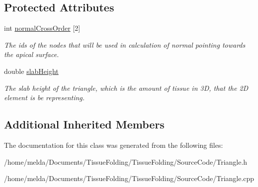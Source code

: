 \subsection*{Protected Attributes}
\begin{DoxyCompactItemize}
\item 
\hypertarget{classTriangle_a39f71d3edb0f3ba6fc632d6dcf5237ac}{}int \hyperlink{classTriangle_a39f71d3edb0f3ba6fc632d6dcf5237ac}{normal\+Cross\+Order} \mbox{[}2\mbox{]}\label{classTriangle_a39f71d3edb0f3ba6fc632d6dcf5237ac}

\begin{DoxyCompactList}\small\item\em The ids of the nodes that will be used in calculation of normal pointing towards the apical surface. \end{DoxyCompactList}\item 
\hypertarget{classTriangle_a78b065ab25dff7133101ec341638532d}{}double \hyperlink{classTriangle_a78b065ab25dff7133101ec341638532d}{slab\+Height}\label{classTriangle_a78b065ab25dff7133101ec341638532d}

\begin{DoxyCompactList}\small\item\em The slab height of the triangle, which is the amount of tissue in 3\+D, that the 2\+D element is be representing. \end{DoxyCompactList}\end{DoxyCompactItemize}
\subsection*{Additional Inherited Members}


The documentation for this class was generated from the following files\+:\begin{DoxyCompactItemize}
\item 
/home/melda/\+Documents/\+Tissue\+Folding/\+Tissue\+Folding/\+Source\+Code/Triangle.\+h\item 
/home/melda/\+Documents/\+Tissue\+Folding/\+Tissue\+Folding/\+Source\+Code/Triangle.\+cpp\end{DoxyCompactItemize}
